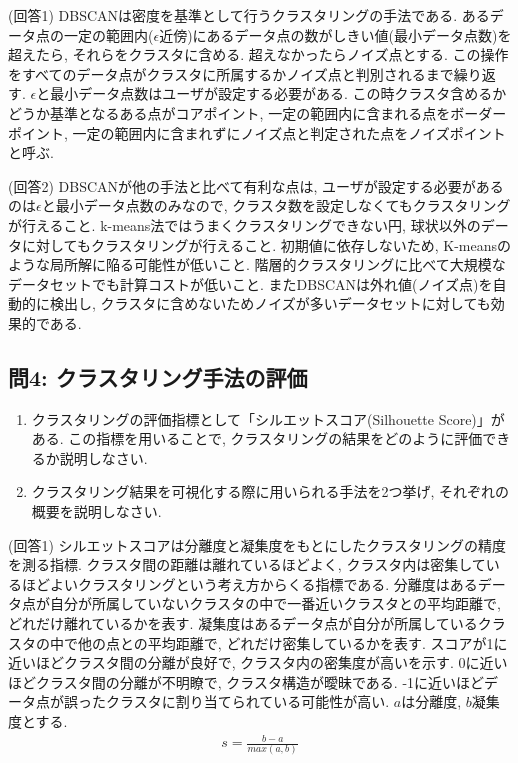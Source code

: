 \documentclass[dvipdfmx, 10pt]{jsarticle}
\begin{document}
(回答1)
DBSCANは密度を基準として行うクラスタリングの手法である. 
あるデータ点の一定の範囲内(\(\epsilon\)近傍)にあるデータ点の数がしきい値(最小データ点数)を超えたら, それらをクラスタに含める. 
超えなかったらノイズ点とする. この操作をすべてのデータ点がクラスタに所属するかノイズ点と判別されるまで繰り返す. 
\(\epsilon\)と最小データ点数はユーザが設定する必要がある. 
この時クラスタ含めるかどうか基準となるある点がコアポイント, 一定の範囲内に含まれる点をボーダーポイント, 
一定の範囲内に含まれずにノイズ点と判定された点をノイズポイントと呼ぶ. 

(回答2)
DBSCANが他の手法と比べて有利な点は, 
ユーザが設定する必要があるのは\(\epsilon\)と最小データ点数のみなので, クラスタ数を設定しなくてもクラスタリングが行えること. 
k-means法ではうまくクラスタリングできない円, 球状以外のデータに対してもクラスタリングが行えること. 
初期値に依存しないため, K-meansのような局所解に陥る可能性が低いこと. 
階層的クラスタリングに比べて大規模なデータセットでも計算コストが低いこと. 
またDBSCANは外れ値(ノイズ点)を自動的に検出し, クラスタに含めないためノイズが多いデータセットに対しても効果的である. 

\subsection*{問4: クラスタリング手法の評価}
\begin{enumerate}
    \item クラスタリングの評価指標として「シルエットスコア(Silhouette Score)」がある. この指標を用いることで, 
    クラスタリングの結果をどのように評価できるか説明しなさい. 
    \item クラスタリング結果を可視化する際に用いられる手法を2つ挙げ, それぞれの概要を説明しなさい. 
\end{enumerate}

(回答1)
シルエットスコアは分離度と凝集度をもとにしたクラスタリングの精度を測る指標. 
クラスタ間の距離は離れているほどよく, クラスタ内は密集しているほどよいクラスタリングという考え方からくる指標である. 
分離度はあるデータ点が自分が所属していないクラスタの中で一番近いクラスタとの平均距離で, どれだけ離れているかを表す. 
凝集度はあるデータ点が自分が所属しているクラスタの中で他の点との平均距離で, どれだけ密集しているかを表す. 
スコアが1に近いほどクラスタ間の分離が良好で, クラスタ内の密集度が高いを示す. 
0に近いほどクラスタ間の分離が不明瞭で, クラスタ構造が曖昧である. 
-1に近いほどデータ点が誤ったクラスタに割り当てられている可能性が高い. 
\(a\)は分離度, \(b\)凝集度とする. 
\begin{align*}
    s = \frac{b-a}{max(a, b)}
\end{align*}
\end{document}
